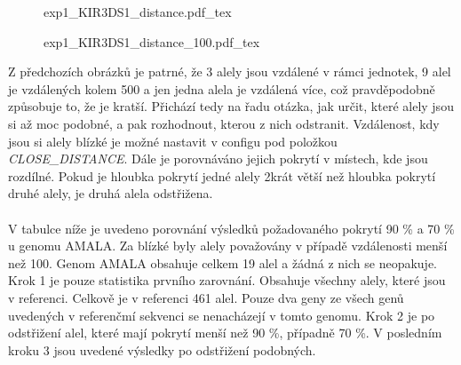 \documentclass[czech,DP]{thesiskiv}
\numberwithin{equation}{section}
\begin{document}
\begin{figure}[H]
	\centering
    \def\svgwidth{\columnwidth}
    {exp1_KIR3DS1_distance.pdf_tex} 
\end{figure}

\begin{figure}[H]
	\centering
    \def\svgwidth{\columnwidth}
    {exp1_KIR3DS1_distance_100.pdf_tex} 
\end{figure}
 
\noindent
Z předchozích obrázků je patrné, že 3 alely jsou vzdálené v rámci jednotek, 9 alel je vzdálených kolem 500 a jen jedna alela je vzdálená více, což pravděpodobně způsobuje to, že je kratší. Přichází tedy na řadu otázka, jak určit, které alely jsou si až moc podobné, a pak rozhodnout, kterou z nich odstranit. Vzdálenost, kdy jsou si alely blízké je možné nastavit v configu pod položkou \textit{CLOSE\_DISTANCE}. Dále je porovnáváno jejich pokrytí v místech, kde jsou rozdílné. Pokud je hloubka pokrytí jedné alely 2krát větší než hloubka pokrytí druhé alely, je druhá alela odstřižena.
\\
\\
V tabulce níže je uvedeno porovnání výsledků požadovaného pokrytí 90 \% a 70 \% u genomu AMALA. Za blízké byly alely považovány v případě vzdálenosti menší než 100. Genom AMALA obsahuje celkem 19 alel a žádná z nich se neopakuje. Krok 1 je pouze statistika prvního zarovnání. Obsahuje všechny alely, které jsou v referenci. Celkově je v referenci 461 alel. Pouze dva geny ze všech genů uvedených v referenčmí sekvenci se nenacházejí v tomto genomu. Krok 2 je po odstřižení alel, které mají pokrytí menší než 90 \%, případně 70 \%. V posledním kroku 3 jsou uvedené výsledky po odstřižení podobných. 
\\
\\
\end{document}
